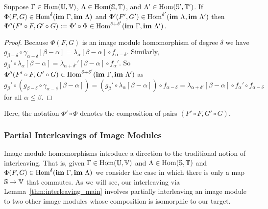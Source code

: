 \begin{lemma}\label{lem:image_composition}
  Suppose $\Gamma\in\mathrm{Hom}(\mathbb{U},\mathbb{V})$, $\Lambda\in\mathrm{Hom}(\mathbb{S},\mathbb{T})$, and $\Lambda'\in\mathrm{Hom}(\mathbb{S}',\mathbb{T}')$.
  If $\Phi(F, G)\in\mathrm{Hom}^\delta(\mathbf{im}~\Gamma, \mathbf{im}~\Lambda)$ and $\Phi'(F', G')\in\mathrm{Hom}^{\delta'}(\mathbf{im}~\Lambda, \mathbf{im}~\Lambda')$ then $\Phi''(F'\circ F, G'\circ G) := \Phi'\circ\Phi\in\mathrm{Hom}^{\delta+\delta'}(\mathbf{im}~\Gamma,\mathbf{im}~\Lambda')$.
\end{lemma}
\begin{proof}
  Because $\Phi(F, G)$ is an image module homomorphism of degree $\delta$ we have $g_{\beta-\delta}\circ\gamma_{\alpha-\delta}[\beta-\alpha] = \lambda_\alpha[\beta-\alpha]\circ f_{\alpha-\delta}$.
  Similarly, $g_{\beta}'\circ\lambda_{\alpha}[\beta-\alpha] = \lambda_{\alpha +\delta'}'[\beta-\alpha]\circ f_{\alpha}'$.
  So $\Phi''(F'\circ F, G'\circ G)\in\mathrm{Hom}^{\delta+\delta'}(\mathbf{im}~\Gamma,\mathbf{im}~\Lambda')$ as
  \[ g_\beta'\circ (g_{\beta-\delta}\circ \gamma_{\alpha-\delta}[\beta-\alpha]) = (g_\beta'\circ \lambda_\alpha[\beta-\alpha])\circ f_{\alpha-\delta} =\lambda_{\alpha+\delta'}[\beta-\alpha]\circ f_\alpha'\circ f_{\alpha-\delta}\]
  for all $\alpha\leq\beta$.

\end{proof}

Here, the notation $\Phi'\circ \Phi$ denotes the composition of pairs $(F'\circ F, G'\circ G)$.

\subsubsection{Partial Interleavings of Image Modules}

Image module homomorphisms introduce a direction to the traditional notion of interleaving.
That is, given $\Gamma\in\mathrm{Hom}(\mathbb{U},\mathbb{V})$ and $\Lambda\in\mathrm{Hom}(\mathbb{S},\mathbb{T})$ and $\Phi(F, G)\in\mathrm{Hom}^\delta(\mathbf{im}~\Gamma, \mathbf{im}~\Lambda)$ we consider the case in which there is only a map $\mathbb{S}\to\mathbb{V}$ that commutes.
As we will see, our interleaving via Lemma~\ref{thm:interleaving_main} involves partially interleaving an image module to two other image modules whose composition is isomorphic to our target.

